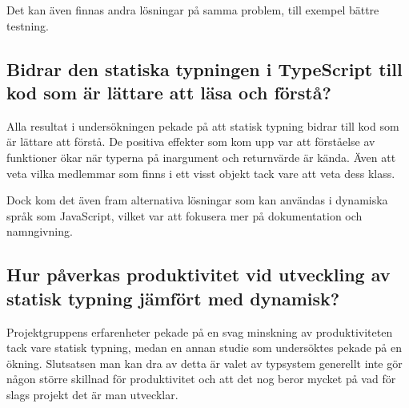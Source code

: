 Det kan även finnas andra lösningar på samma problem, till exempel bättre testning.
\subsection{Bidrar den statiska typningen i TypeScript till kod som är lättare att läsa och förstå?}
Alla resultat i undersökningen pekade på att statisk typning bidrar till kod som är lättare att förstå. De positiva effekter som kom upp var att förståelse av funktioner ökar när typerna på inargument och returnvärde är kända. Även att veta vilka medlemmar som finns i ett visst objekt tack vare att veta dess klass.

Dock kom det även fram alternativa lösningar som kan användas i dynamiska språk som JavaScript, vilket var att fokusera mer på dokumentation och namngivning.
\subsection{Hur påverkas produktivitet vid utveckling av statisk typning jämfört med dynamisk?}
Projektgruppens erfarenheter pekade på en svag minskning av produktiviteten tack vare statisk typning, medan en annan studie som undersöktes pekade på en ökning. Slutsatsen man kan dra av detta är valet av typsystem generellt inte gör någon större skillnad för produktivitet och att det nog beror mycket på vad för slags projekt det är man utvecklar.
